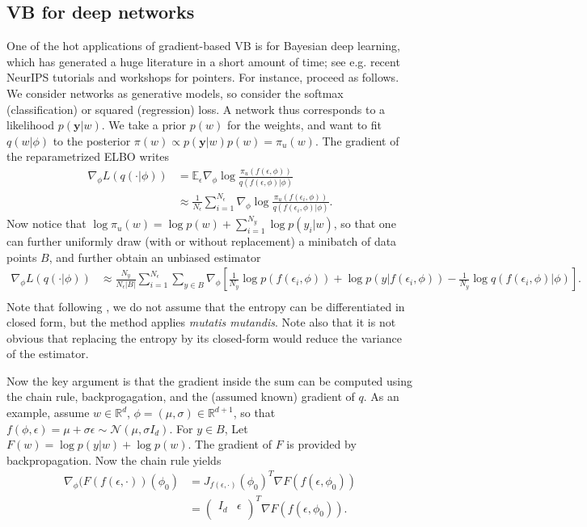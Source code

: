 \subsection{VB for deep networks}
One of the hot applications of gradient-based VB is for Bayesian deep learning, which has generated a huge literature in a short amount of time; see e.g. recent NeurIPS tutorials and workshops for pointers.  
For instance, \cite{BCKW15} proceed as follows.
We consider networks as generative models, so consider the softmax (classification) or squared (regression) loss.
A network thus corresponds to a likelihood $p(\mathbf{y}\vert w)$.
We take a prior $p(w)$ for the weights, and want to fit $q(w\vert\phi)$ to the posterior $\pi(w) \propto p(\mathbf{y}\vert w)p(w) = \pi_u(w)$.
The gradient of the reparametrized ELBO writes
\begin{align*}
\nabla_\phi L(q(\cdot\vert\phi)) &= \mathbb E_\epsilon \nabla_\phi \log \frac{\pi_u(f(\epsilon,\phi))}{q(f(\epsilon,\phi)\vert\phi)}\\
&\approx \frac{1}{N_\epsilon} \sum_{i=1}^{N_\epsilon} \nabla_\phi \log \frac{\pi_u(f(\epsilon_i,\phi))}{q(f(\epsilon_i,\phi)\vert\phi)}.
\end{align*}
Now notice that $\log\pi_u(w) = \log p(w) + \sum_{i=1}^{N_y} \log p(y_i\vert w)$, so that one can further uniformly draw (with or without replacement) a minibatch of data points $B$, and further obtain an unbiased estimator 
\begin{align*}
\nabla_\phi L(q(\cdot\vert\phi)) &\approx \frac{N_y}{N_\epsilon \vert B\vert} \sum_{i=1}^{N_\epsilon} \sum_{y\in B} \nabla_\phi \left [ \frac{1}{N_y}\log p(f(\epsilon_i,\phi)) + \log p(y\vert f(\epsilon_i,\phi)) - \frac{1}{N_y}\log q(f(\epsilon_i,\phi)\vert\phi) \right ].\\
\end{align*}
Note that following \cite{BCKW15}, we do not assume that the entropy can be differentiated in closed form, but the method applies \emph{mutatis mutandis}. 
Note also that it is not obvious that replacing the entropy by its closed-form would reduce the variance of the estimator.

Now the key argument is that the gradient inside the sum can be computed using the chain rule, backprogagation, and the (assumed known) gradient of $q$.
As an example, assume $w\in\mathbb{R}^d$, $\phi=(\mu,\sigma)\in\mathbb{R}^{d+1}$, so that $f(\phi,\epsilon) = \mu + \sigma \epsilon \sim \mathcal{N}(\mu, \sigma I_d)$. 
For $y\in B$, Let $F(w) = \log p(y\vert w) + \log p(w)$. 
The gradient of $F$ is provided by backpropagation. 
Now the chain rule yields
\begin{align*}
  \nabla_\phi (F(f(\epsilon, \cdot))(\phi_0) &= J_{f(\epsilon,\cdot)}(\phi_0)^T \nabla F (f(\epsilon, \phi_0))\\
  &= \begin{pmatrix} I_d & \epsilon \\\end{pmatrix}^T \nabla F (f(\epsilon, \phi_0)).
\end{align*}

